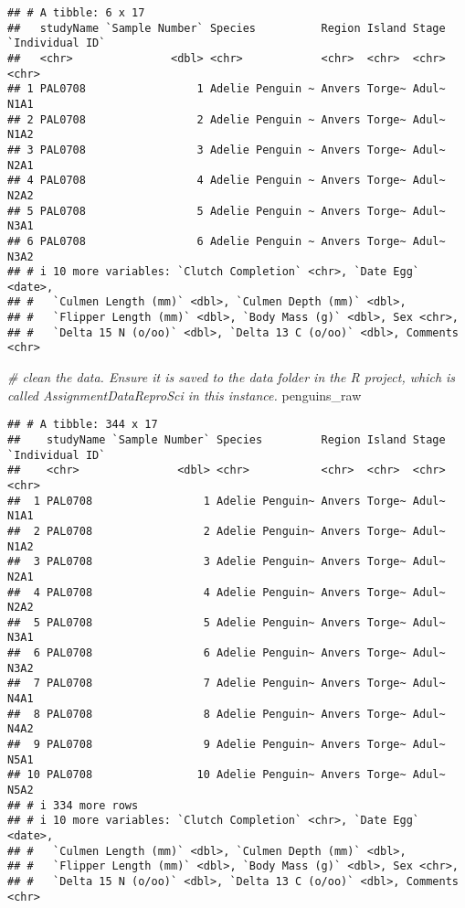 \documentclass[
]{article}
\newenvironment{Shaded}{\begin{snugshade}}{\end{snugshade}}
\newcommand{\CommentTok}[1]{\textcolor[rgb]{0.56,0.35,0.01}{\textit{#1}}}
\newcommand{\NormalTok}[1]{#1}
\begin{document}
\begin{verbatim}
## # A tibble: 6 x 17
##   studyName `Sample Number` Species          Region Island Stage `Individual ID`
##   <chr>               <dbl> <chr>            <chr>  <chr>  <chr> <chr>          
## 1 PAL0708                 1 Adelie Penguin ~ Anvers Torge~ Adul~ N1A1           
## 2 PAL0708                 2 Adelie Penguin ~ Anvers Torge~ Adul~ N1A2           
## 3 PAL0708                 3 Adelie Penguin ~ Anvers Torge~ Adul~ N2A1           
## 4 PAL0708                 4 Adelie Penguin ~ Anvers Torge~ Adul~ N2A2           
## 5 PAL0708                 5 Adelie Penguin ~ Anvers Torge~ Adul~ N3A1           
## 6 PAL0708                 6 Adelie Penguin ~ Anvers Torge~ Adul~ N3A2           
## # i 10 more variables: `Clutch Completion` <chr>, `Date Egg` <date>,
## #   `Culmen Length (mm)` <dbl>, `Culmen Depth (mm)` <dbl>,
## #   `Flipper Length (mm)` <dbl>, `Body Mass (g)` <dbl>, Sex <chr>,
## #   `Delta 15 N (o/oo)` <dbl>, `Delta 13 C (o/oo)` <dbl>, Comments <chr>
\end{verbatim}

\begin{Shaded}
\end{Shaded}

\begin{Shaded}
\begin{Highlighting}[]
\CommentTok{\# clean the data. Ensure it is saved to the data folder in the R project, which is called AssignmentDataReproSci in this instance.}
\NormalTok{penguins\_raw}
\end{Highlighting}
\end{Shaded}

\begin{verbatim}
## # A tibble: 344 x 17
##    studyName `Sample Number` Species         Region Island Stage `Individual ID`
##    <chr>               <dbl> <chr>           <chr>  <chr>  <chr> <chr>          
##  1 PAL0708                 1 Adelie Penguin~ Anvers Torge~ Adul~ N1A1           
##  2 PAL0708                 2 Adelie Penguin~ Anvers Torge~ Adul~ N1A2           
##  3 PAL0708                 3 Adelie Penguin~ Anvers Torge~ Adul~ N2A1           
##  4 PAL0708                 4 Adelie Penguin~ Anvers Torge~ Adul~ N2A2           
##  5 PAL0708                 5 Adelie Penguin~ Anvers Torge~ Adul~ N3A1           
##  6 PAL0708                 6 Adelie Penguin~ Anvers Torge~ Adul~ N3A2           
##  7 PAL0708                 7 Adelie Penguin~ Anvers Torge~ Adul~ N4A1           
##  8 PAL0708                 8 Adelie Penguin~ Anvers Torge~ Adul~ N4A2           
##  9 PAL0708                 9 Adelie Penguin~ Anvers Torge~ Adul~ N5A1           
## 10 PAL0708                10 Adelie Penguin~ Anvers Torge~ Adul~ N5A2           
## # i 334 more rows
## # i 10 more variables: `Clutch Completion` <chr>, `Date Egg` <date>,
## #   `Culmen Length (mm)` <dbl>, `Culmen Depth (mm)` <dbl>,
## #   `Flipper Length (mm)` <dbl>, `Body Mass (g)` <dbl>, Sex <chr>,
## #   `Delta 15 N (o/oo)` <dbl>, `Delta 13 C (o/oo)` <dbl>, Comments <chr>
\end{verbatim}
\end{document}
